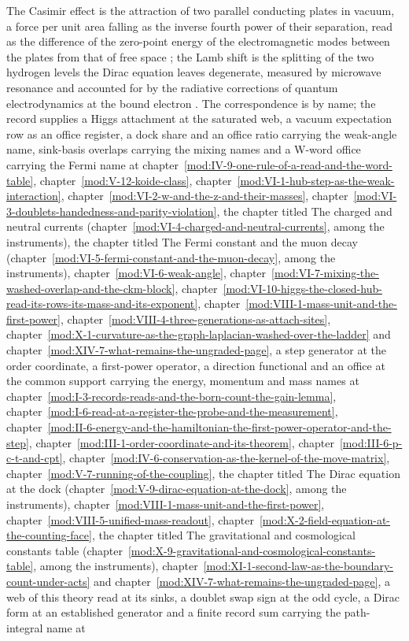 \begin{chbridge}
The Casimir effect is the attraction of two parallel conducting plates in vacuum, a force per unit area falling as the inverse fourth power of their separation, read as the difference of the zero-point energy of the electromagnetic modes between the plates from that of free space \cite{Casimir1948}; the Lamb shift is the splitting of the two hydrogen levels the Dirac equation leaves degenerate, measured by microwave resonance \cite{Lamb1947} and accounted for by the radiative corrections of quantum electrodynamics at the bound electron \cite{Bethe1947}. The correspondence is by name; the record supplies a Higgs attachment at the saturated web, a vacuum expectation row as an office register, a dock share and an office ratio carrying the weak-angle name, sink-basis overlaps carrying the mixing names and a W-word office carrying the Fermi name at chapter~\ref{mod:IV-9-one-rule-of-a-read-and-the-word-table}, chapter~\ref{mod:V-12-koide-class}, chapter~\ref{mod:VI-1-hub-step-as-the-weak-interaction}, chapter~\ref{mod:VI-2-w-and-the-z-and-their-masses}, chapter~\ref{mod:VI-3-doublets-handedness-and-parity-violation}, the chapter titled The charged and neutral currents (chapter~\ref{mod:VI-4-charged-and-neutral-currents}, among the instruments), the chapter titled The Fermi constant and the muon decay (chapter~\ref{mod:VI-5-fermi-constant-and-the-muon-decay}, among the instruments), chapter~\ref{mod:VI-6-weak-angle}, chapter~\ref{mod:VI-7-mixing-the-washed-overlap-and-the-ckm-block}, chapter~\ref{mod:VI-10-higgs-the-closed-hub-read-its-rows-its-mass-and-its-exponent}, chapter~\ref{mod:VIII-1-mass-unit-and-the-first-power}, chapter~\ref{mod:VIII-4-three-generations-as-attach-sites}, chapter~\ref{mod:X-1-curvature-as-the-graph-laplacian-washed-over-the-ladder} and chapter~\ref{mod:XIV-7-what-remains-the-ungraded-page}, a step generator at the order coordinate, a first-power operator, a direction functional and an office at the common support carrying the energy, momentum and mass names at chapter~\ref{mod:I-3-records-reads-and-the-born-count-the-gain-lemma}, chapter~\ref{mod:I-6-read-at-a-register-the-probe-and-the-measurement}, chapter~\ref{mod:II-6-energy-and-the-hamiltonian-the-first-power-operator-and-the-step}, chapter~\ref{mod:III-1-order-coordinate-and-its-theorem}, chapter~\ref{mod:III-6-p-c-t-and-cpt}, chapter~\ref{mod:IV-6-conservation-as-the-kernel-of-the-move-matrix}, chapter~\ref{mod:V-7-running-of-the-coupling}, the chapter titled The Dirac equation at the dock (chapter~\ref{mod:V-9-dirac-equation-at-the-dock}, among the instruments), chapter~\ref{mod:VIII-1-mass-unit-and-the-first-power}, chapter~\ref{mod:VIII-5-unified-mass-readout}, chapter~\ref{mod:X-2-field-equation-at-the-counting-face}, the chapter titled The gravitational and cosmological constants table (chapter~\ref{mod:X-9-gravitational-and-cosmological-constants-table}, among the instruments), chapter~\ref{mod:XI-1-second-law-as-the-boundary-count-under-acts} and chapter~\ref{mod:XIV-7-what-remains-the-ungraded-page}, a web of this theory read at its sinks, a doublet swap sign at the odd cycle, a Dirac form at an established generator and a finite record sum carrying the path-integral name at 
\end{chbridge}
